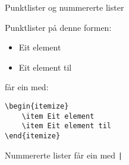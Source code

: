 \begin{frame}[containsverbatim]{Punktlister og nummererte lister}
	
Punktlister på denne formen:

	\begin{itemize}
		\item Eit element
		\item Eit element til
	\end{itemize}

får ein med:
	
	\begin{verbatim}
\begin{itemize}
	\item Eit element
	\item Eit element til
\end{itemize}
	\end{verbatim}

Nummererte lister får ein med \texttt|
	
\end{frame}


%	
%	
%	
	
%	



